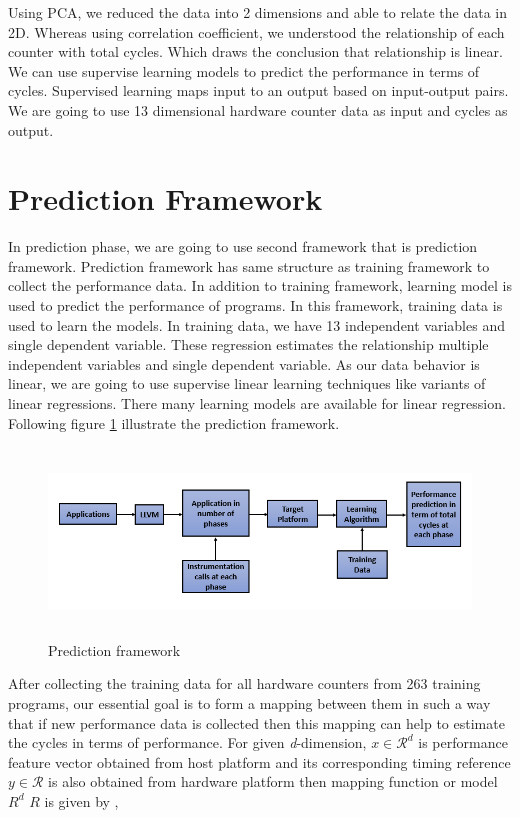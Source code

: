 \par Using PCA, we reduced the data into 2 dimensions and able to relate the data in 2D. Whereas using correlation coefficient, we understood the relationship of each counter with total cycles. Which draws the conclusion that relationship is linear. We can use supervise learning models to predict the performance in terms of cycles. Supervised learning maps input to an output based on input-output pairs. We are going to use 13 dimensional hardware counter data as input and cycles as output. 

\section{Prediction Framework}

 In prediction phase, we are going to use second framework that is prediction framework.  Prediction framework has same structure as training framework to collect the performance data. In addition to training framework, learning model is used to predict the performance of programs. In this framework, training data is used to learn the models. In training data, we have 13 independent variables and single dependent variable. These regression estimates the relationship multiple independent variables and single dependent variable. As our data behavior is linear, we are going to use supervise linear learning techniques like variants of linear regressions. There many learning models are available for linear regression. Following figure \ref{fig:prediction} illustrate the prediction framework. 

\begin{figure}[h!]
\includegraphics[width=14cm, height=5cm]{./images/prediction}
\centering
\caption{Prediction framework}
\label{fig:prediction}
\end{figure}

After collecting the training data for all hardware counters from 263 training programs, our essential goal is to form a mapping between them in such a way that if new performance data is collected then this mapping can help to estimate the cycles in terms of performance. For given \textit{d}-dimension, $x \in \mathcal{R}^d$ is performance feature vector obtained from host platform and its corresponding timing reference $y \in \mathcal{R}$ is also obtained from hardware platform then mapping function or model ${R}^d$ \textrightarrow ${R}$ is given by , 

